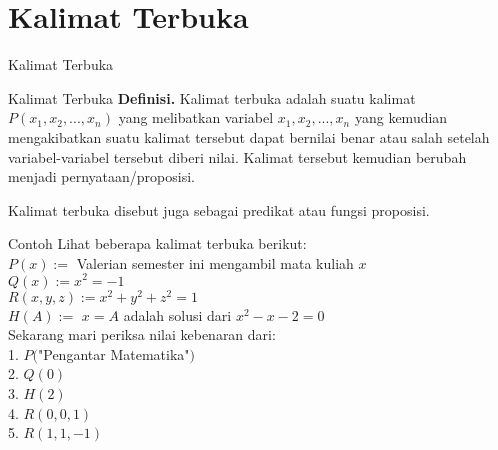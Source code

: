 \documentclass[11pt]{beamer}
\begin{document}
\section{Kalimat Terbuka}
\begin{frame}{Kalimat Terbuka}
\pause
\begin{block}{Kalimat Terbuka}
	\textbf{Definisi.} Kalimat terbuka adalah suatu kalimat $P(x_1, x_2, ... , x_n)$ yang melibatkan variabel $x_1, x_2, ..., x_n$ yang kemudian mengakibatkan suatu kalimat tersebut dapat bernilai benar atau salah setelah variabel-variabel tersebut diberi nilai. Kalimat tersebut kemudian berubah menjadi pernyataan/proposisi. \cite{TS18}
\end{block}
\pause
Kalimat terbuka disebut juga sebagai predikat atau fungsi proposisi.
\end{frame}
\begin{frame}{Contoh}
Lihat beberapa kalimat terbuka berikut:\\
$P(x) :=$ Valerian semester ini mengambil mata kuliah $x$\\
\pause
$Q(x) := x^2 = -1$\\
\pause
$R(x,y,z) := x^2 + y^2 + z^2 = 1$\\
\pause
$H(A) :=$ $x = A$ adalah solusi dari $x^2 - x - 2= 0$
\pause\\

Sekarang mari periksa nilai kebenaran dari:\\
1. $P($"Pengantar Matematika"$)$\pause\\2. $Q(0)$\pause\\3. $H(2)$\pause\\4. $R(0,0,1)$\pause\\5. $R(1,1,-1)$
\end{frame}
\end{document}
